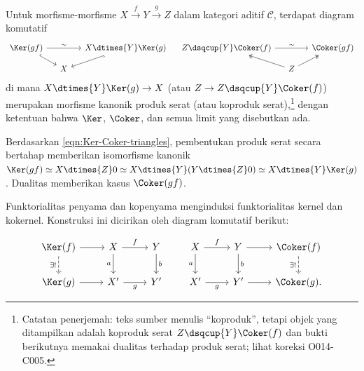 \begin{proposisi}\label{prop:Ker-Coker-composite}
	Untuk morfisme-morfisme $X \xrightarrow{f} Y \xrightarrow{g} Z$ dalam
	kategori aditif $\mathcal{C}$, terdapat diagram komutatif
	\[\begin{tikzcd}[row sep=small, column sep=small]
		\Ker(gf) \arrow[rr, "\sim"] \arrow[hookrightarrow, rd] & & X \dtimes{Y} \Ker(g) \arrow[hookrightarrow, ld] \\
		& X &
	\end{tikzcd} \quad \begin{tikzcd}[row sep=small, column sep=small]
		Z \dsqcup{Y} \Coker(f) \arrow[rr, "\sim"] & & \Coker(gf) \\
		& Z \arrow[twoheadrightarrow, lu] \arrow[twoheadrightarrow, ru] &
	\end{tikzcd}\]
	di mana $X \dtimes{Y} \Ker(g) \to X$ (atau
	$Z \to Z \dsqcup{Y} \Coker(f)$) merupakan morfisme kanonik produk serat
	(atau koproduk serat),\footnote{Catatan penerjemah: teks sumber
	menulis ``koproduk'', tetapi objek yang ditampilkan adalah koproduk serat
	$Z \dsqcup{Y} \Coker(f)$ dan bukti berikutnya memakai dualitas terhadap
	produk serat; lihat koreksi O014-C005.} dengan ketentuan bahwa $\Ker$,
	$\Coker$, dan semua limit yang disebutkan ada.
\end{proposisi}

\begin{bukti}
	Berdasarkan \eqref{eqn:Ker-Coker-triangles}, pembentukan produk serat secara
	bertahap memberikan isomorfisme kanonik
	$\Ker(gf) \simeq X \dtimes{Z} 0 \simeq
	X \dtimes{Y} (Y \dtimes{Z} 0) \simeq X \dtimes{Y} \Ker(g)$.
	Dualitas memberikan kasus $\Coker(gf)$.
\end{bukti}

Funktorialitas penyama dan kopenyama menginduksi funktorialitas kernel dan
kokernel. Konstruksi ini dicirikan oleh diagram komutatif berikut:

\begin{equation}\label{eqn:Ker-Coker-functoriality}\begin{tikzcd}
		\Ker(f) \arrow[r] \arrow[dashrightarrow, d, "\exists!"'] & X \arrow[d, "a"'] \arrow[r, "f"] & Y \arrow[d, "b"] \\
		\Ker(g) \arrow[r] & X' \arrow[r, "g"'] & Y'
	\end{tikzcd} \qquad \begin{tikzcd}
		X \arrow[d, "a"'] \arrow[r, "f"] & Y \arrow[d, "b"] \arrow[r] & \Coker(f) \arrow[dashrightarrow, d, "\exists!"'] \\
		X' \arrow[r, "g"'] & Y' \arrow[r] & \Coker(g) .
\end{tikzcd}\end{equation}

